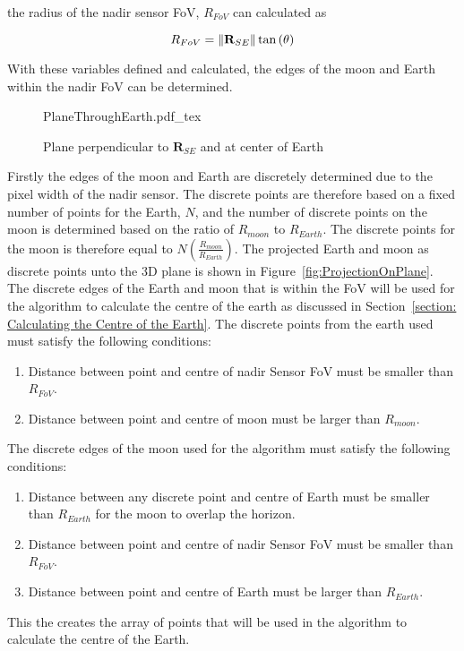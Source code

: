 the radius of the nadir sensor FoV, $R_{FoV}$ can calculated as 

\begin{equation}
	R_{FoV} = \left\lVert\mathbf{R}_{SE}\right\rVert \tan\left(\theta \right)
\end{equation}

With these variables defined and calculated, the edges of the moon and Earth within the nadir FoV can be determined.


\begin{figure}[!hbt]
	\centering
	\def\svgwidth{14cm}
	{PlaneThroughEarth.pdf_tex}
	\caption{Plane perpendicular to $\mathbf{R}_{SE}$ and at center of Earth}
	\label{fig:PlaneThroughEarth}
\end{figure}

Firstly the edges of the moon and Earth are discretely determined due to the pixel width of the nadir sensor. The discrete points are therefore based on a fixed number of points for the Earth, $N$, and the number of discrete points on the moon is determined based on the ratio of $R_{moon}$ to $R_{Earth}$. The discrete points for the moon is therefore equal to $N \left(\frac{R_{moon}}{R_{Earth}} \right)$. The projected Earth and moon as discrete points unto the 3D plane is shown in Figure~\ref{fig:ProjectionOnPlane}. The discrete edges of the Earth and moon that is within the FoV will be used for the algorithm to calculate the centre of the earth as discussed in Section~\ref{section: Calculating the Centre of the Earth}. The discrete points from the earth used must satisfy the following conditions:
\begin{enumerate}
	\item Distance between point and centre of nadir Sensor FoV must be smaller than $R_{FoV}$.
	\item Distance between point and centre of moon must be larger than $R_{moon}$.
\end{enumerate}
The discrete edges of the moon used for the algorithm must satisfy the following conditions:
\begin{enumerate}
	\item Distance between any discrete point and centre of Earth must be smaller than $R_{Earth}$ for the moon to overlap the horizon.
	\item Distance between point and centre of nadir Sensor FoV must be smaller than $R_{FoV}$.
	\item Distance between point and centre of Earth must be larger than $R_{Earth}$.
\end{enumerate}
This the creates the array of points that will be used in the algorithm to calculate the centre of the Earth.

